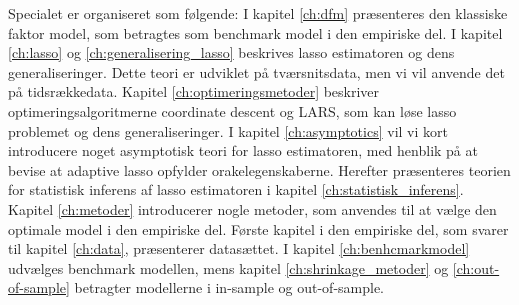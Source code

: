 Specialet er organiseret som følgende: 
I kapitel \ref{ch:dfm} præsenteres den klassiske faktor model, som betragtes som benchmark model i den empiriske del.
I kapitel \ref{ch:lasso} og \ref{ch:generalisering_lasso} beskrives lasso estimatoren og dens generaliseringer. Dette teori er udviklet på tværsnitsdata, men vi vil anvende det på tidsrækkedata.
Kapitel \ref{ch:optimeringsmetoder} beskriver optimeringsalgoritmerne coordinate descent og LARS, som kan løse lasso problemet og dens generaliseringer.
I kapitel \ref{ch:asymptotics} vil vi kort introducere noget asymptotisk teori for lasso estimatoren, med henblik på at bevise at adaptive lasso opfylder orakelegenskaberne.
Herefter præsenteres teorien for statistisk inferens af lasso estimatoren i kapitel \ref{ch:statistisk_inferens}.
Kapitel \ref{ch:metoder} introducerer nogle metoder, som anvendes til at vælge den optimale model i den empiriske del.
Første kapitel i den empiriske del, som svarer til kapitel \ref{ch:data}, præsenterer datasættet.
I kapitel \ref{ch:benhcmarkmodel} udvælges benchmark modellen, mens kapitel \ref{ch:shrinkage_metoder} og \ref{ch:out-of-sample} betragter modellerne i in-sample og out-of-sample.

